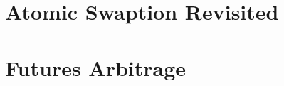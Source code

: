 \documentclass[a4paper,11pt]{IEEEtran}
\begin{document}
        \section{Atomic Swaption Revisited}
        \label{sec:swaption}
        
% 
%
        \section{Futures Arbitrage}
        \label{sec:arbitrage}
        



%

% 


% 





	
	

%  



%


\end{document}
